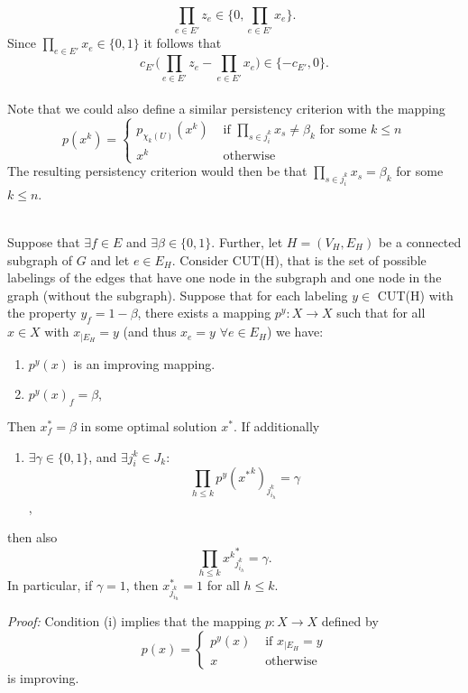 \[\prod_{e \in E'} z_e \in \Big\{0, \prod_{e \in E'} x_e\Big\}. \] 
Since $\prod_{e \in E'} x_e \in \{ 0, 1 \}$ it follows that 
\[ c_{E'}  \Big( \prod_{e \in E'} z_e - \prod_{e \in E'} x_e \Big) \in \{ -c_{E'}, 0\}. \] 
\\ Note that we could also define a similar persistency criterion with the mapping 
\[ p(x^k)= \begin{cases}
    p_{\chi_k(U)}(x^k) & \text{ if  } \prod_{s \in j^k_i} x_s \neq \beta_k \text{ for some } k \leq  n\\
    x^k & \text{ otherwise } 
\end{cases} \]
The resulting persistency criterion would then be that $\prod_{s \in j^k_i} x_s = \beta_k$ for some $k \leq n$. \\ \\ 
\begin{lemma}
Suppose that $\exists f \in E$ and $\exists \beta \in \{0,1\}$. Further, let $H=(V_H, E_H)$ be a connected subgraph of $G$ and let $e \in E_H$. Consider CUT(H), that is the set of possible labelings of the edges that have one node in the subgraph and one node in the graph (without the subgraph). Suppose that for each labeling $y \in $ CUT(H) with the property $y_f =1- \beta$, there exists a mapping $p^y: X \rightarrow X$ such that for all $x \in X$ with $x_{|E_H}=y$ (and thus $x_e=y$  $\forall e \in E_H$) we have:  
\begin{enumerate}
    \item $p^y(x)$ is an improving mapping.
    \item $p^y(x)_f = \beta$, \\
\end{enumerate}    
Then $x^*_f = \beta$ in some optimal solution $x^*$. If additionally 
\begin{enumerate}[resume]
    \item $\exists \gamma \in \{0,1\}$, and $\exists j^k_{i} \in J_k$: \[ \prod_{h \leq k} p^y({x^*}^k)_{j^k_{i_h}}=\gamma \], 
\end{enumerate}
then also \[ \prod_{h \leq k} {x^k}^*_{j^k_{i_h}}=\gamma. \] In particular, if $\gamma=1$, then $x^*_{j^k_{i_h}}=1$ for all $h \leq k$. 
\end{lemma}
\textit{Proof:} Condition (i) implies that the mapping $p:X \rightarrow X$ defined by 
\[ p(x)= \begin{cases}
    p^y(x) & \text{ if } x_{|E_H} =y \\
    x & \text{ otherwise } 
\end{cases} \]
is improving. 
